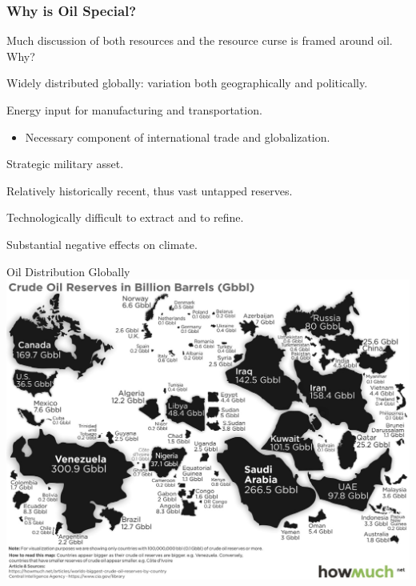 \documentclass[handout]{beamer}
\begin{document}
\begin{frame} 
	\frametitle{\LARGE{Why is Oil Special?}}
	Much discussion of both resources and the resource curse is framed around oil. Why? \pause
	\begin{itemize}
		\large{  
			\item Widely distributed globally: variation both geographically and politically. \pause
			
			\item Energy input for manufacturing and transportation. \pause
			\begin{itemize}
				\item Necessary component of international trade and globalization. \pause
			\end{itemize}
			
			\item Strategic military asset. \pause 
			
			\item Relatively historically recent, thus vast untapped reserves. \pause 
			
			\item Technologically difficult to extract and to refine. \pause 
			
			\item Substantial negative effects on climate.
		}
	\end{itemize}
\end{frame}

\begin{frame}{\LARGE Oil Distribution Globally}
	\centering
	\includegraphics[width=\textwidth,height=0.9\textheight,keepaspectratio]{oil distribution.jpg}
\end{frame}
\end{document}
